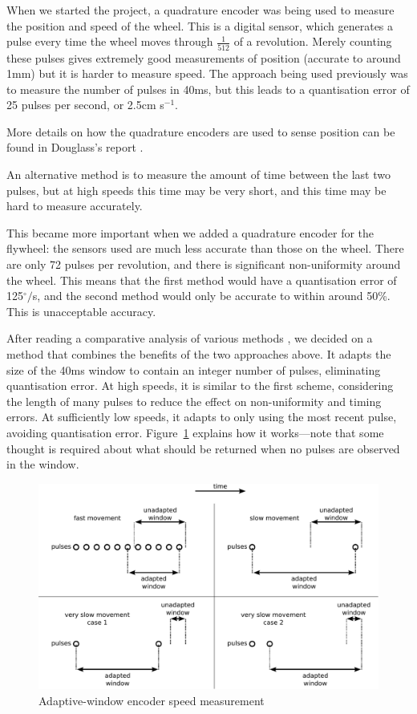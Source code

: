 \documentclass{IIBproject}
\begin{document}
When we started the project, a quadrature encoder was being used to measure
the position and speed of the wheel. This is a digital sensor, which generates
a pulse every time the wheel moves through $\frac{1}{512}$ of a revolution.
Merely counting these pulses gives extremely good measurements of position
(accurate to around 1mm) but it is harder to measure speed. The approach being
used previously was to measure the number of pulses in 40ms, but this leads to
a quantisation error of 25 pulses per second, or 2.5cm s$^{-1}$.

More details on how the quadrature encoders are used to sense position can be
found in Douglass's report \nocite{ref:douglass}.

An alternative method is to measure the amount of time between the last two
pulses, but at high speeds this time may be very short, and this time may be
hard to measure accurately.

This became more important when we added a quadrature encoder for the
flywheel: the sensors used are much less accurate than those on the wheel.
There are only 72 pulses per revolution, and there is significant
non-uniformity around the wheel. This means that the first method would have a
quantisation error of 125$^\circ/$s, and the second method would only be
accurate to within around 50\%. This is unacceptable accuracy.

After reading a comparative analysis of various methods \cite{ref:encspeed},
we decided on a method that combines the benefits of the two approaches above.
It adapts the size of the 40ms window to contain an integer number of pulses,
eliminating quantisation error. At high speeds, it is similar to the first
scheme, considering the length of many pulses to reduce the effect on
non-uniformity and timing errors. At sufficiently low speeds, it adapts to
only using the most recent pulse, avoiding quantisation error.
Figure~\ref{fig:encoder_speed} explains how it works---note that some thought
is required about what should be returned when no pulses are observed in the
window.

\begin{figure}[htpb]
  \begin{center}
    \includegraphics[width=15cm]{encoder_speed.pdf}
    \end{center}
    \caption{Adaptive-window encoder speed measurement}
    \label{fig:encoder_speed}
    \end{figure}
\end{document}
